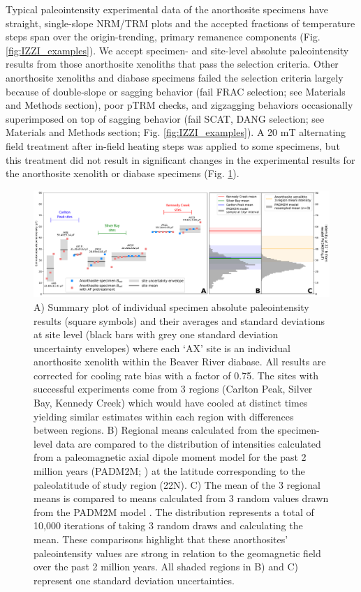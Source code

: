 \documentclass[9pt,twocolumn,twoside,lineno]{pnas-new}
\begin{document}
Typical paleointensity experimental data of the anorthosite specimens have straight, single-slope NRM/TRM plots and the accepted fractions of temperature steps span over the origin-trending, primary remanence components (Fig. \ref{fig:IZZI_examples}). We accept specimen- and site-level absolute paleointensity results from those anorthosite xenoliths that pass the selection criteria. Other anorthosite xenoliths and diabase specimens failed the selection criteria largely because of double-slope or sagging behavior (fail FRAC selection; see Materials and Methods section), poor pTRM checks, and zigzagging behaviors occasionally superimposed on top of sagging behavior (fail SCAT, DANG selection; see Materials and Methods section; Fig. \ref{fig:IZZI_examples}). A 20 mT alternating field treatment after in-field heating steps was applied to some specimens, but this treatment did not result in significant changes in the experimental results for the anorthosite xenolith or diabase specimens (Fig. \ref{fig:PINT_cooling_corrected}). 

\begin{figure}[h!]
\noindent\includegraphics[width=17.8 cm]{Paleointensity_plot_cooling_corrected.pdf}
\centering
\caption{\footnotesize{A) Summary plot of individual specimen absolute paleointensity results (square symbols) and their averages and standard deviations at site level (black bars with grey one standard deviation uncertainty envelopes) where each `AX' site is an individual anorthosite xenolith within the Beaver River diabase. All results are corrected for cooling rate bias with a factor of 0.75. The sites with successful experiments come from 3 regions (Carlton Peak, Silver Bay, Kennedy Creek) which would have cooled at distinct times yielding similar estimates within each region with differences between regions. B) Regional means calculated from the specimen-level data are compared to the distribution of intensities calculated from a paleomagnetic axial dipole moment model for the past 2 million years (PADM2M; \citealp{Ziegler2011a}) at the latitude corresponding to the paleolatitude of study region (22\textdegree N). C) The mean of the 3 regional means is compared to means calculated from 3 random values drawn from the PADM2M model \cite{Ziegler2011a}. The distribution represents a total of 10,000 iterations of taking 3 random draws and calculating the mean. These comparisons highlight that these anorthosites' paleointensity values are strong in relation to the geomagnetic field over the past 2 million years. All shaded regions in B) and C) represent one standard deviation uncertainties.}}
\label{fig:PINT_cooling_corrected}
\end{figure}
\end{document}
